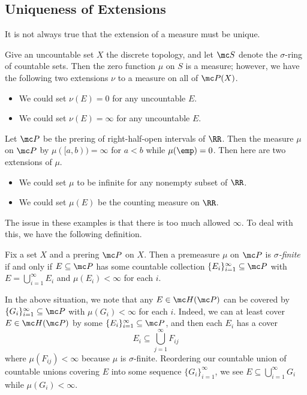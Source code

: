 \documentclass[../notes.tex]{subfiles}
\begin{document}
\subsection{Uniqueness of Extensions}
It is not always true that the extension of a measure must be unique.
\begin{example}
	Give an uncountable set $X$ the discrete topology, and let $\mc S$ denote the $\sigma$-ring of countable sets. Then the zero function $\mu$ on $S$ is a measure; however, we have the following two extensions $\nu$ to a measure on all of $\mc P(X)$.
	\begin{itemize}
		\item We could set $\nu(E)=0$ for any uncountable $E$.
		\item We could set $\nu(E)=\infty$ for any uncountable $E$.
	\end{itemize}
\end{example}
\begin{ex}
	Let $\mc P$ be the prering of right-half-open intervals of $\RR$. Then the measure $\mu$ on $\mc P$ by $\mu([a,b))=\infty$ for $a<b$ while $\mu(\emp)=0$. Then here are two extensions of $\mu$.
	\begin{itemize}
		\item We could set $\mu$ to be infinite for any nonempty subset of $\RR$.
		\item We could set $\mu(E)$ be the counting measure on $\RR$.
	\end{itemize}
\end{ex}
The issue in these examples is that there is too much allowed $\infty$. To deal with this, we have the following definition.
\begin{defihelper} 
	Fix a set $X$ and a prering $\mc P$ on $X$. Then a premeasure $\mu$ on $\mc P$ is \textit{$\sigma$-finite} if and only if $E\subseteq\mc P$ has some countable collection $\{E_i\}_{i=1}^\infty\subseteq\mc P$ with $E=\bigcup_{i=1}^\infty E_i$ and $\mu(E_i)<\infty$ for each $i$.
\end{defihelper}
\begin{remark} \label{rem:cover-hered-ring-sigma-finite}
	In the above situation, we note that any $E\in\mc H(\mc P)$ can be covered by $\{G_i\}_{i=1}^\infty\subseteq\mc P$ with $\mu(G_i)<\infty$ for each $i$. Indeed, we can at least cover $E\in\mc H(\mc P)$ by some $\{E_i\}_{i=1}^\infty\subseteq\mc P$, and then each $E_i$ has a cover
	\[E_i\subseteq\bigcup_{j=1}^\infty F_{ij}\]
	where $\mu(F_{ij})<\infty$ because $\mu$ is $\sigma$-finite. Reordering our countable union of countable unions covering $E$ into some sequence $\{G_i\}_{i=1}^\infty$, we see $E\subseteq\bigcup_{i=1}^\infty G_i$ while $\mu(G_i)<\infty$.
\end{remark}
\end{document}
